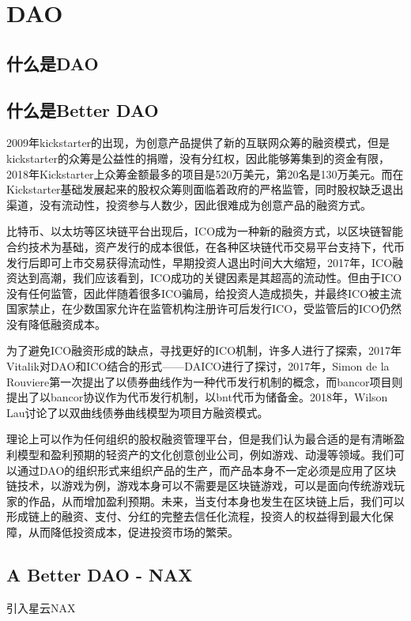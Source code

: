 \section{DAO}

\subsection{什么是DAO}

\subsection{什么是Better DAO}
2009年kickstarter的出现，为创意产品提供了新的互联网众筹的融资模式，但是kickstarter的众筹是公益性的捐赠，没有分红权，因此能够筹集到的资金有限，2018年Kickstarter上众筹金额最多的项目是520万美元，第20名是130万美元。而在Kickstarter基础发展起来的股权众筹则面临着政府的严格监管，同时股权缺乏退出渠道，没有流动性，投资参与人数少，因此很难成为创意产品的融资方式。

比特币、以太坊等区块链平台出现后，ICO成为一种新的融资方式，以区块链智能合约技术为基础，资产发行的成本很低，在各种区块链代币交易平台支持下，代币发行后即可上市交易获得流动性，早期投资人退出时间大大缩短，2017年，ICO融资达到高潮，我们应该看到，ICO成功的关键因素是其超高的流动性。但由于ICO没有任何监管，因此伴随着很多ICO骗局，给投资人造成损失，并最终ICO被主流国家禁止，在少数国家允许在监管机构注册许可后发行ICO，受监管后的ICO仍然没有降低融资成本。

为了避免ICO融资形成的缺点，寻找更好的ICO机制，许多人进行了探索，2017年Vitalik对DAO和ICO结合的形式——DAICO进行了探讨，2017年，Simon de la Rouviere第一次提出了以债券曲线作为一种代币发行机制的概念，而bancor项目则提出了以bancor协议作为代币发行机制，以bnt代币为储备金。2018年，Wilson Lau讨论了以双曲线债券曲线模型为项目方融资模式。

理论上可以作为任何组织的股权融资管理平台，但是我们认为最合适的是有清晰盈利模型和盈利预期的轻资产的文化创意创业公司，例如游戏、动漫等领域。我们可以通过DAO的组织形式来组织产品的生产，而产品本身不一定必须是应用了区块链技术，以游戏为例，游戏本身可以不需要是区块链游戏，可以是面向传统游戏玩家的作品，从而增加盈利预期。未来，当支付本身也发生在区块链上后，我们可以形成链上的融资、支付、分红的完整去信任化流程，投资人的权益得到最大化保障，从而降低投资成本，促进投资市场的繁荣。


\subsection{A Better DAO - NAX}
引入星云NAX